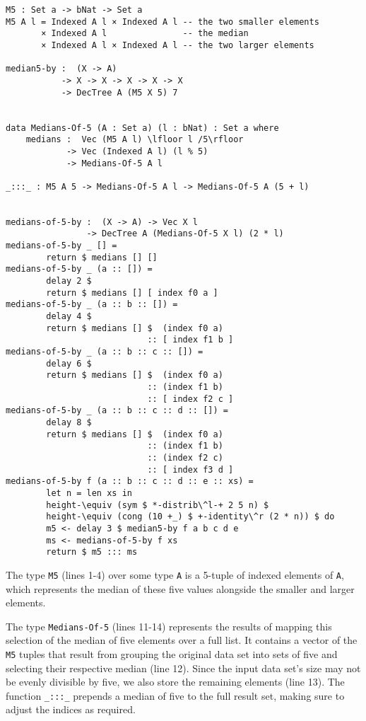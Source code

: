 \begin{lstlisting}[caption={Median of 5},label={lst:median:medofmeds},emph={M,median,by,medians,of}]
M5 : Set a -> bNat -> Set a
M5 A l = Indexed A l × Indexed A l -- the two smaller elements
       × Indexed A l               -- the median
       × Indexed A l × Indexed A l -- the two larger elements

median5-by :  (X -> A)
           -> X -> X -> X -> X -> X
           -> DecTree A (M5 X 5) 7


data Medians-Of-5 (A : Set a) (l : bNat) : Set a where
    medians :  Vec (M5 A l) \lfloor l /5\rfloor
            -> Vec (Indexed A l) (l % 5)
            -> Medians-Of-5 A l

_:::_ : M5 A 5 -> Medians-Of-5 A l -> Medians-Of-5 A (5 + l)


medians-of-5-by :  (X -> A) -> Vec X l
                -> DecTree A (Medians-Of-5 X l) (2 * l)
medians-of-5-by _ [] =
        return $ medians [] []
medians-of-5-by _ (a :: []) =
        delay 2 $
        return $ medians [] [ index f0 a ]
medians-of-5-by _ (a :: b :: []) =
        delay 4 $
        return $ medians [] $  (index f0 a)
                            :: [ index f1 b ]
medians-of-5-by _ (a :: b :: c :: []) =
        delay 6 $
        return $ medians [] $  (index f0 a)
                            :: (index f1 b)
                            :: [ index f2 c ]
medians-of-5-by _ (a :: b :: c :: d :: []) =
        delay 8 $
        return $ medians [] $  (index f0 a)
                            :: (index f1 b)
                            :: (index f2 c)
                            :: [ index f3 d ]
medians-of-5-by f (a :: b :: c :: d :: e :: xs) =
        let n = len xs in
        height-\equiv (sym $ *-distrib\^l-+ 2 5 n) $
        height-\equiv (cong (10 +_) $ +-identity\^r (2 * n)) $ do
        m5 <- delay 3 $ median5-by f a b c d e
        ms <- medians-of-5-by f xs
        return $ m5 ::: ms

\end{lstlisting}

The type \texttt{M5} (lines 1-4) over some type \texttt{A} is a 5-tuple of indexed elements of \texttt{A}, which represents the median of these five values alongside the smaller and larger elements.

The type \texttt{Medians-Of-5} (lines 11-14) represents the results of mapping this selection of the median of five elements over a full list. It contains a vector of the \texttt{M5} tuples that result from grouping the original data set into sets of five and selecting their respective median (line 12). Since the input data set's size may not be evenly divisible by five, we also store the remaining elements (line 13). The function \texttt{\_:::\_} prepends a median of five to the full result set, making sure to adjust the indices as required.

